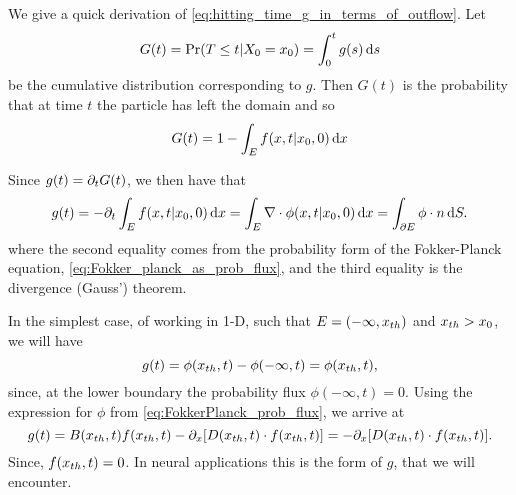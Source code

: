 We give a quick derivation of \cref{eq:hitting_time_g_in_terms_of_outflow}. Let
$$G(t) = \Pr(T\leq t | X_0=x_0) = \int_0^t g(s) \, \mathrm{d} s$$ be the cumulative
distribution corresponding to $g$. Then $G(t)$ is the probability
that at time $t$ the particle has left the domain and so 
$$G(t) = 1- \int_E f(x,t|x_0,0) \, \mathrm{d} x$$

Since $g(t) = {\partial}_t G(t)$, we then have that  
$$g(t) = - {\partial}_t \int_E f(x,t|x_0,0) \, \mathrm{d} x = \int_E { \nabla } \cdot
\phi(x,t|x_0,0) \, \mathrm{d} x = \int_{{\partial} E} \phi \cdot n \, \mathrm{d} S.$$
where the second equality comes from the probability form of the Fokker-Planck equation,
\cref{eq:Fokker_planck_as_prob_flux}, and the third  equality is the divergence
(Gauss') theorem.

In the simplest case, of working in 1-D, such that $E = (-\infty, { x_{th} })$ and
${ x_{th} }>x_0$, we will have 
$$  g(t) = \phi({ x_{th} }, t) - \phi(-\infty,t) = \phi({ x_{th} }, t),$$
since, at the lower boundary the probability flux $\phi(-\infty,t)=0$. Using
the expression for $\phi$ from \cref{eq:FokkerPlanck_prob_flux}, we arrive at 
 $$  g(t) = B({ x_{th} },t)f({ x_{th} },t ) -{\partial}_x[ D({ x_{th} },t) \cdot f({ x_{th} },t )]= -{\partial}_x[
 D({ x_{th} },t) \cdot f({ x_{th} },t )].$$
 Since, $f({ x_{th} },t)=0$. In neural applications this is the form of $g$, that we
 will encounter. 

% 
% 


